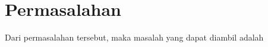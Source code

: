 \section{Permasalahan}
\label{sec:permasalahan}

Dari permasalahan tersebut, maka masalah yang dapat diambil adalah \textcolor{red}{\lipsum[1][1-6]}
